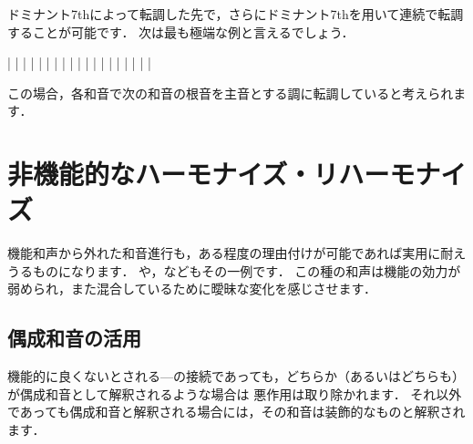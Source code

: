 \documentclass[dvipdfmx,uplatex,b5paper,openany,jbase=12Q,nomag*,textwidth-limit=44%
               ]{gachimuchi}[2020/05/05]
\begin{document}
ドミナント7thによって転調した先で，さらにドミナント7thを用いて連続で転調することが可能です．
次は最も極端な例と言えるでしょう．

\begin{Music}
  \generalmeter{\meterC}%
  \Startpiece
  \NOTes%
  |%
  \en%
  \NOTes%
  |%
  \en\bar%
  \NOTes%
  |%
  \en%
  \NOTes%
  |%
  \en\bar%
  \NOTes%
  |%
  \en%
  \NOTes%
  |%
  \en\bar%
  \NOTes%
  |%
  \en%
  \NOTes%
  |%
  \en\bar\addspace{.2\afterruleskip}%
  \NOTes%
  |%
  \en%
  \NOTes%
  |%
  \en\bar%
  \NOTes%
  |%
  \en%
  \NOTes%
  |%
  \en\bar%
  \notes\sk\en%
  \NOTEs%
  |%
  \en\setdoublebar%
  \endpiece
\end{Music}

この場合，各和音で次の和音の根音を主音とする調に転調していると考えられます．


\chapter{非機能的なハーモナイズ・リハーモナイズ}
機能和声から外れた和音進行も，ある程度の理由付けが可能であれば実用に耐えうるものになります．
や，などもその一例です．
この種の和声は機能の効力が弱められ，また混合しているために曖昧な変化を感じさせます．

\section{偶成和音の活用}
機能的に良くないとされる---の接続であっても，どちらか（あるいはどちらも）が偶成和音として解釈されるような場合は
悪作用は取り除かれます．
それ以外であっても偶成和音と解釈される場合には，その和音は装飾的なものと解釈されます．
\end{document}
